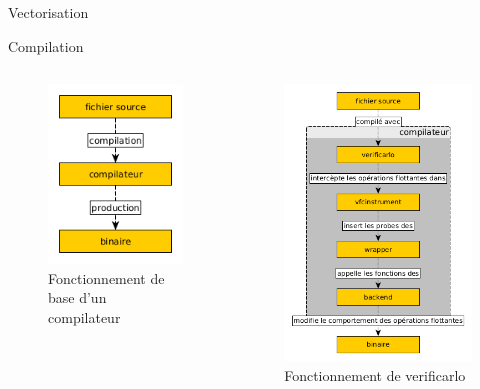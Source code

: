 \documentclass{beamer}
\begin{document}
\begin{frame}{Vectorisation}
  \begin{block}{Compilation}
    \begin{columns}[T]
      \begin{column}{.5\textwidth}
        \begin{center}
          \begin{figure}
            \centering
            \includegraphics[scale=0.4]{../ressources/compilation.png}
            \caption{Fonctionnement de base d'un compilateur}
            \label{fig:compilateur}
          \end{figure}
        \end{center}
      \end{column}
      \begin{column}{.5\textwidth}
        \begin{figure}
          \centering
          \includegraphics[scale=0.3]{../ressources/verificarlo_works.png}
          \caption{Fonctionnement de verificarlo}
          \label{fig:fonctionnement_verificarlo}
        \end{figure}
      \end{column}
    \end{columns}
  \end{block}
\end{frame}
\end{document}
